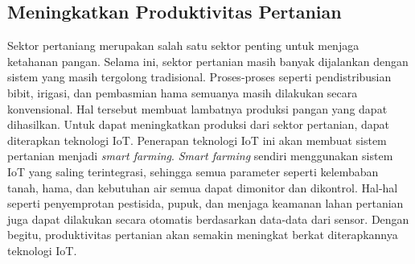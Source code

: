 \documentclass[12pt, letterpaper]{article}
\begin{document}
\subsection{Meningkatkan Produktivitas Pertanian}
Sektor pertaniang merupakan salah satu sektor penting untuk menjaga ketahanan pangan. Selama ini, sektor pertanian masih banyak dijalankan dengan sistem yang masih tergolong tradisional. Proses-proses seperti pendistribusian bibit, irigasi, dan pembasmian hama semuanya masih dilakukan secara konvensional. Hal tersebut membuat lambatnya produksi pangan yang dapat dihasilkan.
\newline
\indent
Untuk dapat meningkatkan produksi dari sektor pertanian, dapat diterapkan teknologi IoT. Penerapan teknologi IoT ini akan membuat sistem pertanian menjadi \textit{smart farming}. \textit{Smart farming} sendiri menggunakan sistem IoT yang saling terintegrasi, sehingga semua parameter seperti kelembaban tanah, hama, dan kebutuhan air semua dapat dimonitor dan dikontrol. Hal-hal seperti penyemprotan pestisida, pupuk, dan menjaga keamanan lahan pertanian juga dapat dilakukan secara otomatis
berdasarkan data-data dari sensor. Dengan begitu, produktivitas pertanian akan semakin meningkat berkat diterapkannya teknologi IoT.\cite{iemcon17} 

\newpage
\printbibliography[title=Daftar Pustaka]
\end{document}
